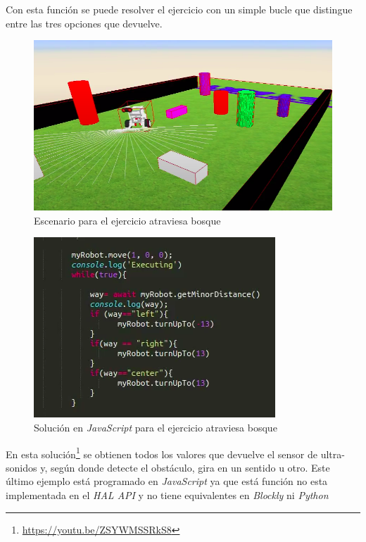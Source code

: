Con esta función se puede resolver el ejercicio con un simple bucle que distingue entre las tres opciones que devuelve.

    \begin{figure}[H]
    \centering
    \includegraphics[scale=0.45]{img/forest.png}
    \caption{Escenario para el ejercicio atraviesa bosque} 
    \label{fig:atraviesaBosque}
    \end{figure}

    \begin{figure}[H]
    \centering
    \includegraphics[scale=0.6]{img/solucionforest.png}
    \caption{Solución en \textit{JavaScript} para el ejercicio atraviesa bosque} 
    \label{fig:solucionforest}
    \end{figure}
    
    En esta solución\footnote{\url{https://youtu.be/ZSYWMSSRkS8}} se obtienen todos los valores que devuelve el sensor de ultra-sonidos y, según donde detecte el obstáculo, gira en un sentido u otro. Este último ejemplo está programado en \textit{JavaScript} ya que está función no esta implementada en el \textit{HAL API} y no tiene equivalentes en \textit{Blockly} ni \textit{Python}


